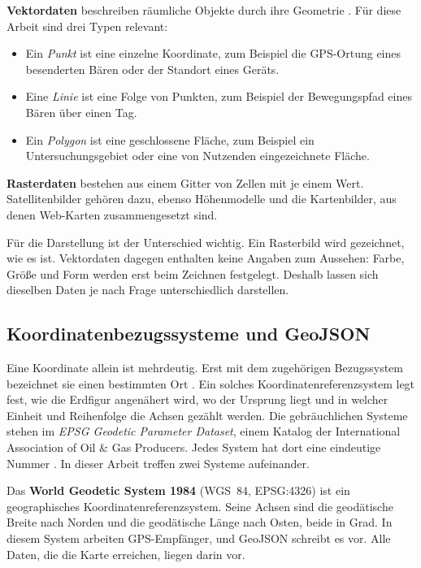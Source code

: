 \documentclass[12pt,a4paper]{report}
\begin{document}
\textbf{Vektordaten} beschreiben räumliche Objekte
durch ihre Geometrie \cite{GISGrundlagen}.
Für diese Arbeit sind drei Typen relevant:


\begin{itemize}
    \item Ein \emph{Punkt} ist eine einzelne Koordinate, zum Beispiel die GPS-Ortung eines
    besenderten Bären oder der Standort eines Geräts.
    \item Eine \emph{Linie} ist eine Folge von Punkten, zum Beispiel der Bewegungspfad eines
    Bären über einen Tag.
    \item Ein \emph{Polygon} ist eine geschlossene Fläche, zum Beispiel ein
    Untersuchungsgebiet oder eine von Nutzenden eingezeichnete Fläche.
\end{itemize}

\textbf{Rasterdaten} bestehen aus einem Gitter von Zellen mit je einem Wert.
Satellitenbilder gehören dazu, ebenso Höhenmodelle und die Kartenbilder, aus denen
Web-Karten zusammengesetzt sind.

Für die Darstellung ist der Unterschied wichtig. Ein Rasterbild wird gezeichnet, wie es
ist. Vektordaten dagegen enthalten keine Angaben zum Aussehen: Farbe, Größe und Form
werden erst beim Zeichnen festgelegt. Deshalb lassen sich dieselben Daten je nach Frage
unterschiedlich darstellen.

\subsection{Koordinatenbezugssysteme und GeoJSON}
\label{subsec:crs}

Eine Koordinate allein ist mehrdeutig. Erst mit dem zugehörigen Bezugssystem bezeichnet
sie einen bestimmten Ort \cite{GISGrundlagen}. Ein solches Koordinatenreferenzsystem legt
fest, wie die Erdfigur angenähert wird, wo der Ursprung liegt und in welcher Einheit und
Reihenfolge die Achsen gezählt werden. Die gebräuchlichen Systeme stehen im \emph{EPSG
Geodetic Parameter Dataset}, einem Katalog der International Association of Oil \& Gas
Producers. Jedes System hat dort eine eindeutige Nummer \cite{EPSG}. In dieser Arbeit
treffen zwei Systeme aufeinander.

Das \textbf{World Geodetic System 1984} (WGS~84, EPSG:4326) ist ein geographisches
Koordinatenreferenzsystem. Seine Achsen sind die geodätische Breite nach Norden und die
geodätische Länge nach Osten, beide in Grad. In diesem System arbeiten GPS-Empfänger, und
GeoJSON schreibt es vor. Alle Daten, die die Karte erreichen, liegen darin vor.
\end{document}
